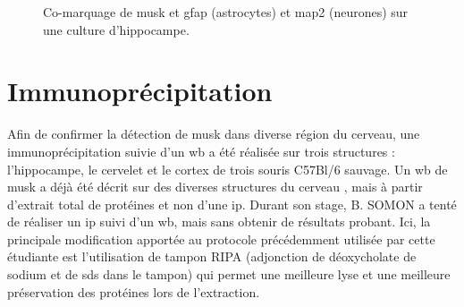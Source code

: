 \begin{figure}
\begin{subfigure}[h]{0.329\textwidth}
		\end{subfigure}
	\caption{Co-marquage de \gls{musk} et \gls{gfap} (astrocytes) et \gls{map2} (neurones) sur une culture d'hippocampe.}
	\label{fig:MuSKMAP2GFAP}
	\end{figure}
	\FloatBarrier

\section{Immunoprécipitation}
\label{sec:IPresultat}
	Afin de confirmer la détection de \gls{musk} dans diverse région du cerveau, une immunoprécipitation suivie d'un \gls{wb} a été réalisée sur trois structures : l'hippocampe, le cervelet et le cortex de trois souris C57Bl/6 sauvage. Un \gls{wb} de \gls{musk} a déjà été décrit sur des diverses structures du cerveau \cite{Garcia-Osta2006}, mais à partir d'extrait total de protéines et non d'une \gls{ip}. Durant son stage, B. SOMON a tenté de réaliser un \gls{ip} suivi d'un \gls{wb}, mais sans obtenir de résultats probant. Ici, la principale modification apportée au protocole précédemment utilisée par cette étudiante est l'utilisation de tampon RIPA (adjonction de déoxycholate de sodium et de \acrshort{sds} dans le tampon) qui permet une meilleure lyse et une meilleure préservation des protéines lors de l'extraction.
	
